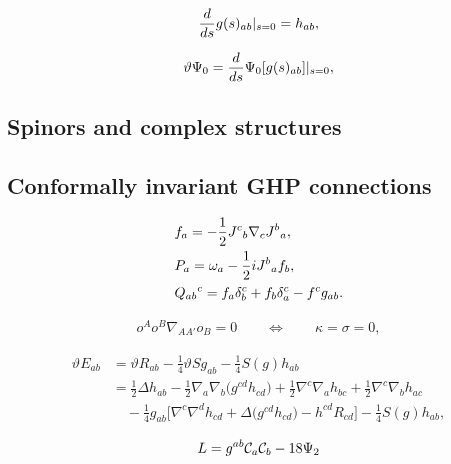 \documentclass[10pt,a4paper]{amsart}
\numberwithin{equation}{section}
\begin{document}
\begin{align} \label{eq:LinMetric}
\frac{{\rm d}}{{\rm d}s} g(s)_{ab} |_{s=0} = h_{ab},
\end{align}

\begin{align} \label{eq:LinPsi0}
\vartheta \Psi_0 = \frac{{\rm d}}{{\rm d}s} \Psi_0[g(s)_{ab}] |_{s=0},
\end{align}

\subsection{Spinors and complex structures} \label{sec:spinors}

\subsection{Conformally invariant GHP connections} \label{sec:CGHP}

\begin{align}
&f_{a} = -\frac{1}{2}J^{c}{}_{b}\nabla_{c}J^{b}{}_{a}, \label{LeeForm} \\
&P_{a} = \omega_{a} -\frac{1}{2} {\rm i} J^{b}{}_{a}f_{b}, \label{1formP} \\
&Q_{ab}{}^{c} = f_{a}\delta^{c}_{b} + f_{b}\delta^{c}_{a} - f^{c}g_{ab}. \nonumber
\end{align}

\begin{align}\label{SFR}
o^{A}o^{B}\nabla_{AA'}o_{B} = 0 \qquad \Leftrightarrow \qquad \kappa=\sigma=0,
\end{align}

\begin{align}
\vartheta E_{ab} &{}= \vartheta R_{ab} - \frac{1}{4}\vartheta S g_{ab} - \frac{1}{4}S(g)h_{ab} \nonumber\\
&{}= \frac{1}{2}\Delta h_{ab} - \frac{1}{2}\nabla_{a}\nabla_{b}\bigl(g^{cd}h_{cd}\bigr) + \frac{1}{2}\nabla^{c}\nabla_{a}h_{bc} + \frac{1}{2}\nabla^{c} \nabla_{b}h_{ac} \nonumber\\
&\quad{} - \frac{1}{4}g_{ab}\bigl[ \nabla^{c}\nabla^{d}h_{cd} + \Delta\bigl(g^{cd}h_{cd}\bigr) - h^{cd}R_{cd} \bigr]
-\frac{1}{4}S(g) h_{ab},\label{LinEinsteinOp}
\end{align}

\begin{align}\label{TeukOp}
 {\rm L}=g^{ab}\mathcal{C}_{a}\mathcal{C}_{b}-18\Psi_{2}
\end{align}
\end{document}
